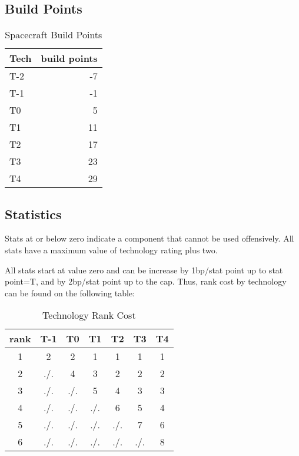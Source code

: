 \subsection{Build Points}\label{sec:spacecraft-build-points} %


\begin{table}[ht]
\centering
\begin{tabular}{lr}
\toprule
Tech & build points \\
\midrule
T-2 & -7 \\
T-1 & -1 \\
T0 & 5 \\
T1 & 11 \\
T2 & 17 \\
T3 & 23 \\
T4 & 29 \\
\bottomrule
\end{tabular}
\caption{Spacecraft Build Points}
\label{tab:spacecraft-build-points}
\end{table}


\subsection{Statistics}\label{sec:Statistics} %

Stats at or below zero indicate a component that cannot be used offensively.
All stats have a maximum value of technology rating plus two.

All stats start at value zero and can be increase by 1bp/stat point up
to stat point=T, and by 2bp/stat point up to the cap. Thus, rank cost
by technology can be found on the following table:

\begin{table}[ht]
\centering
\begin{tabular}{*{7}c}
\toprule
rank & T-1 & T0 & T1 & T2 & T3 & T4 \\
\midrule
1 & 2 & 2 & 1 & 1 & 1 & 1 \\
2 & ./. & 4 & 3 & 2 & 2 & 2 \\
3 & ./. & ./. & 5 & 4 & 3 & 3 \\
4 & ./. & ./. & ./. & 6 & 5 & 4 \\
5 & ./. & ./. & ./. & ./. & 7 & 6 \\
6 & ./. & ./. & ./. & ./. & ./. & 8 \\
\bottomrule
\end{tabular}
\caption{Technology Rank Cost}
\label{tab:technology-rank-cost}
\end{table}



